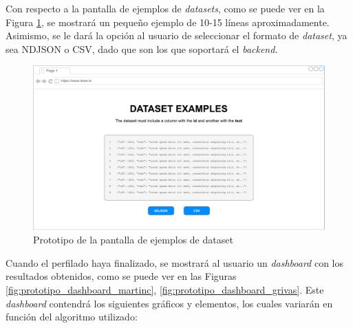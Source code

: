 \bigskip
Con respecto a la pantalla de ejemplos de \textit{datasets}, como se puede ver en la Figura \ref{fig:prototipo_ejemplos_dataset},
se mostrará un pequeño ejemplo de 10-15 líneas aproximadamente. Asimismo, se le dará la opción al usuario de seleccionar el 
formato de \textit{dataset}, ya sea NDJSON o CSV, dado que son los que soportará el \textit{backend}.

\bigskip
\begin{figure}[H]
	\centering
	\includegraphics[width=\textwidth]{diagramas/dataset-examples.pdf}
	\caption{Prototipo de la pantalla de ejemplos de dataset}
	\label{fig:prototipo_ejemplos_dataset}
\end{figure}

\bigskip
Cuando el perfilado haya finalizado, se mostrará al usuario un \textit{dashboard} con los resultados obtenidos,
como se puede ver en las Figuras \ref{fig:prototipo_dashboard_martinc}, \ref{fig:prototipo_dashboard_grivas}. 
Este \textit{dashboard} contendrá los siguientes gráficos y elementos, los cuales variarán en función del algoritmo utilizado:

